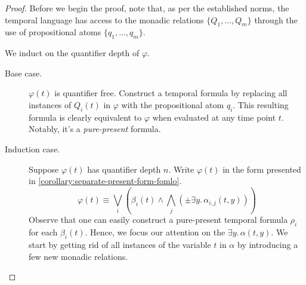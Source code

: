 \documentclass[a4paper,UKenglish,cleveref, autoref, thm-restate, numberwithinsect]{lipics-v2021}
\begin{document}
\begin{proof}
    Before we begin the proof, note that, as per the established norms, the temporal language has access to the monadic relations $\{Q_1, \ldots, Q_m\}$ through the use of propositional atoms $\{q_1, \ldots, q_m\}$.

    We induct on the quantifier depth of $\varphi$.
    \begin{description} %
        \item[Base case.] $\varphi(t)$ is quantifier free. Construct a temporal formula by replacing all instances of $Q_i(t)$ in $\varphi$ with the propositional atom $q_i$. This resulting formula is clearly equivalent to $\varphi$ when evaluated at any time point $t$. Notably, it's a \textit{pure-present} formula.
        \item[Induction case.] Suppose $\varphi(t)$ has quantifier depth $n$. Write $\varphi(t)$ in the form presented in \cref{corollary:separate-present-form-fomlo}.
        \begin{equation}
            \label{eq:present-separate-form-fomlo}
            \varphi(t) \equiv \bigvee_i \left( \beta_i(t) \land \bigwedge_j \left( \pm \exists y.\, \alpha_{i, j}\left(t, y\right) \right) \right)
        \end{equation}
        Observe that one can easily construct a pure-present temporal formula $\rho_i$ for each $\beta_i(t)$. Hence, we focus our attention on the $\exists y.\, \alpha(t, y)$. We start by getting rid of all instances of the variable $t$ in $\alpha$ by introducing a few new monadic relations.


\end{description}
\end{proof}
\end{document}
